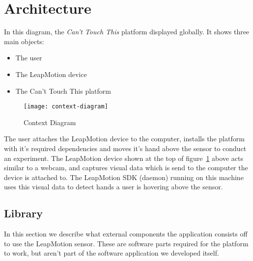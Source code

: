 \documentclass{standalone}
\begin{document}
  \section{Architecture}
  In this diagram, the \textit{Can't Touch This} platform displayed globally.
  It shows three main objects:
  \begin{itemize}
    \tightlist{}
    \item The user
    \item The LeapMotion device
    \item The Can't Touch This platform
  \end{itemize}

  \begin{figure}[h]
    \centering
      \texttt{[image: context-diagram]}
    \caption{Context Diagram}
    \label{fig:context-diagram}
  \end{figure}

  The user attaches the LeapMotion device to the computer, installs the platform
  with it's required dependencies and moves it's hand above the sensor to
  conduct an experiment. The LeapMotion device shown at the top of figure~\ref{fig:context-diagram}
  above acts similar to a webcam, and captures visual data which is send to the
  computer the device is attached to. The LeapMotion SDK (daemon) running on
  this machine uses this visual data to detect hands a user is hovering above
  the sensor.

  \subsection{Library}
  In this section we describe what external components the application consists
  off to use the LeapMotion sensor.
  These are software parts required for the platform to work, but aren't
  part of the software application we developed itself.
\end{document}
